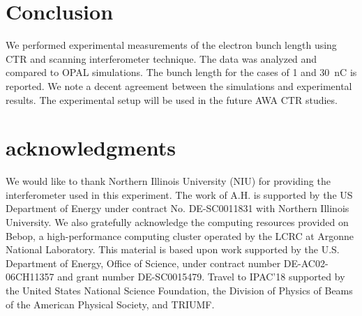 \documentclass[letterpaper,  %
              ]{jacow-2_3}   %
\begin{document}
\section{Conclusion}
We performed experimental measurements of the electron bunch 
length using CTR and scanning interferometer technique.
The data was analyzed and compared to OPAL simulations.
The bunch length for the cases of 1 and \SI{30}{nC} is reported.
We note a decent agreement between the simulations and 
experimental results. The experimental setup will be used in the future
AWA CTR studies. 



\section{acknowledgments}
We would like to thank 
Northern Illinois University (NIU) for providing the 
interferometer used in this experiment. The work of A.H. 
is supported by the US Department of Energy under contract No. DE-SC0011831 with Northern Illinois University.
We also gratefully acknowledge the computing resources
provided on Bebop, a high-performance computing cluster
operated by the LCRC at Argonne National Laboratory.
This material is based upon work supported by the 
U.S. Department of Energy, Office of Science, under 
contract number DE-AC02-06CH11357 and grant number DE-SC0015479. 
Travel to IPAC'18 supported by the United States National Science Foundation, 
the Division of Physics of Beams of the American Physical Society, and TRIUMF.
\end{document}
